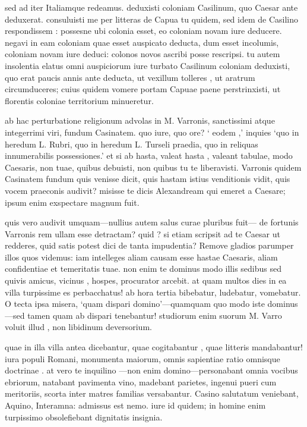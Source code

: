  sed ad iter Italiamque redeamus. deduxisti coloniam Casilinum, quo Caesar ante deduxerat. consuluisti me per litteras de Capua tu quidem, sed idem de Casilino respondissem : possesne ubi colonia esset, eo coloniam novam iure deducere. negavi in eam coloniam quae esset auspicato deducta, dum esset incolumis, coloniam novam iure deduci: colonos novos ascribi posse rescripsi. tu autem insolentia elatus omni auspiciorum iure turbato Casilinum coloniam deduxisti, quo erat paucis annis ante deducta, ut vexillum tolleres , ut aratrum circumduceres; cuius quidem vomere portam Capuae paene perstrinxisti, ut florentis coloniae territorium minueretur.

 ab hac perturbatione religionum advolas in M. Varronis, sanctissimi atque integerrimi viri, fundum Casinatem. quo iure, quo ore? ` eodem ,' inquies `quo in heredum L. Rubri, quo in heredum L. Turseli praedia, quo in reliquas innumerabilis possessiones.' et si ab hasta, valeat hasta , valeant tabulae, modo Caesaris, non tuae, quibus debuisti, non quibus tu te liberavisti. Varronis quidem Casinatem fundum quis venisse dicit, quis hastam istius venditionis vidit, quis vocem praeconis audivit? misisse te dicis Alexandream qui emeret a Caesare; ipsum enim exspectare magnum fuit.

 quis vero audivit umquam—nullius autem salus curae pluribus fuit— de fortunis Varronis rem ullam esse detractam? quid ? si etiam scripsit ad te Caesar ut redderes, quid satis potest dici de tanta impudentia? Remove gladios parumper illos quos videmus: iam intelleges aliam causam esse hastae Caesaris, aliam confidentiae et temeritatis tuae. non enim te dominus modo illis sedibus sed quivis amicus, vicinus , hospes, procurator arcebit. at quam multos dies in ea villa turpissime es perbacchatus! ab hora tertia bibebatur, ludebatur, vomebatur. O tecta ipsa misera, `quam dispari domino'—quamquam quo modo iste dominus—sed tamen quam ab dispari tenebantur! studiorum enim suorum M. Varro voluit illud , non libidinum deversorium.

 quae in illa villa antea dicebantur, quae cogitabantur , quae litteris mandabantur! iura populi Romani, monumenta maiorum, omnis sapientiae ratio omnisque doctrinae . at vero te inquilino —non enim domino—personabant omnia vocibus ebriorum, natabant pavimenta vino, madebant parietes, ingenui pueri cum meritoriis, scorta inter matres familias versabantur. Casino salutatum veniebant, Aquino, Interamna: admissus est nemo. iure id quidem; in homine enim turpissimo obsolefiebant dignitatis insignia.

